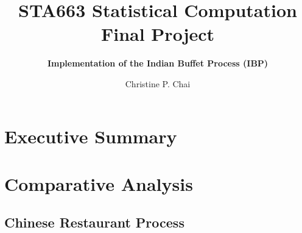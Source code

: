 \documentclass[12pt]{article}
\begin{document}
\vspace{-1in}
\title{\bf STA663 Statistical Computation Final Project}
\author{\bf Implementation of the Indian Buffet Process (IBP)}
\date{Christine P. Chai}
\maketitle 
\vspace{-0.5in}

\section*{Executive Summary}









\section{Comparative Analysis}

\subsection{Chinese Restaurant Process}
\end{document}
